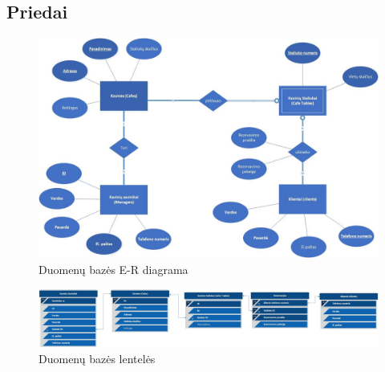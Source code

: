 \documentclass{VUMIFPSkursinis}
\begin{document}
\begin{landscape}
\section{Priedai}
	\begin {figure}[H]
		\includegraphics[width=1.3\textwidth,height=1.4\textheight,keepaspectratio]{img/ER}
		\caption{Duomenų bazės E-R diagrama}
		\label{fig:ER}
	\end{figure}
	
	\begin {figure}
		\includegraphics[width=1.5\textwidth,height=1.65\textheight,keepaspectratio]{img/lenteles}
		\caption{Duomenų bazės lentelės}
		\label{fig:lenteles}
	\end{figure}
\end{landscape}
\end{document}
